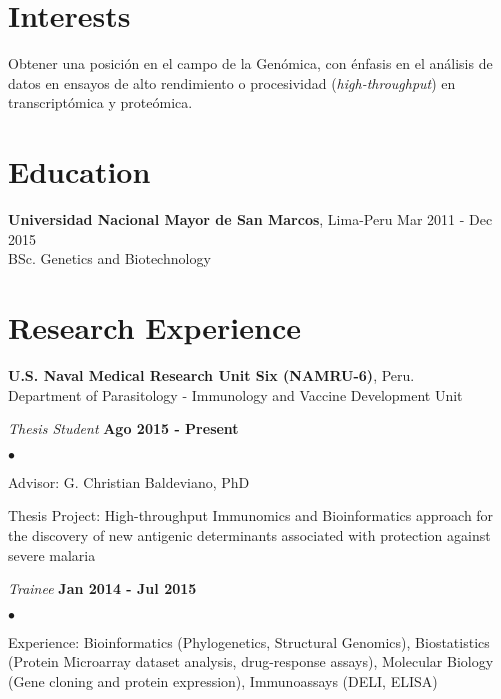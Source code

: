 \documentclass[margin,line]{res}
\newenvironment{list1}{
  \begin{list}{\ding{113}}{%
      \setlength{\itemsep}{0in}
      \setlength{\parsep}{0in} \setlength{\parskip}{0in}
      \setlength{\topsep}{0in} \setlength{\partopsep}{0in}
      \setlength{\leftmargin}{0.17in}}}{\end{list}}
\newenvironment{list2}{
  \begin{list}{$\bullet$}{%
      \setlength{\itemsep}{0in}
      \setlength{\parsep}{0in} \setlength{\parskip}{0in}
      \setlength{\topsep}{0in} \setlength{\partopsep}{0in}
      \setlength{\leftmargin}{0.2in}}}{\end{list}}
\begin{document}
\address{Calle Tambo Huascar 201, San Miguel, Lima-Peru}
\address{\textit{contacto:} avallecam@gmail.com or (+51)950951722}

\begin{resume}

\section{\sc Interests}

Obtener una posición en el campo de la Genómica, con énfasis en el análisis de datos en ensayos de alto rendimiento o procesividad (\textit{high-throughput}) en transcriptómica y proteómica.\\

\section{\sc Education}
{\bf Universidad Nacional Mayor de San Marcos}, Lima-Peru \hfill Mar 2011 - Dec 2015\\
BSc. Genetics and Biotechnology\\

\section{\sc Research Experience}

{\bf U.S. Naval Medical Research Unit Six (NAMRU-6)}, Peru.\\
Department of Parasitology - Immunology and Vaccine Development Unit\\
\vspace*{-.1in}
\begin{list1}
	\item[] {\em Thesis Student} \hfill {\bf Ago 2015 - Present}\\
	\vspace*{-.1in}
	\begin{list2} %
		\item Advisor: G. Christian Baldeviano, PhD
		\item Thesis Project: High-throughput Immunomics and Bioinformatics approach for the discovery of new antigenic determinants associated with protection against severe malaria\\
	\end{list2}
	\vspace*{-.1in}
	\item[] {\em Trainee} \hfill {\bf Jan 2014 - Jul 2015}\\
	\vspace*{-.1in}
	\begin{list2} %
		\item Experience: Bioinformatics (Phylogenetics, Structural Genomics), Biostatistics (Protein Microarray dataset analysis, drug-response assays), Molecular Biology (Gene cloning and protein expression), Immunoassays (DELI, ELISA)
	\end{list2}
\end{list1}


\end{resume}
\end{document}
